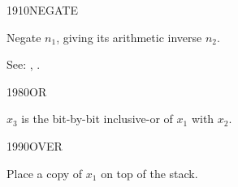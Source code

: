 \begin{newword}{1910}{NEGATE}

	Negate $n_1$, giving its arithmetic inverse $n_2$.

\item[See:]
	,
	.
\end{newword}


\begin{newword}{1980}{OR}

	$x_3$ is the bit-by-bit inclusive-or of $x_1$ with $x_2$.
\end{newword}


\begin{newword}{1990}{OVER}

	Place a copy of $x_1$ on top of the stack.
\end{newword}


